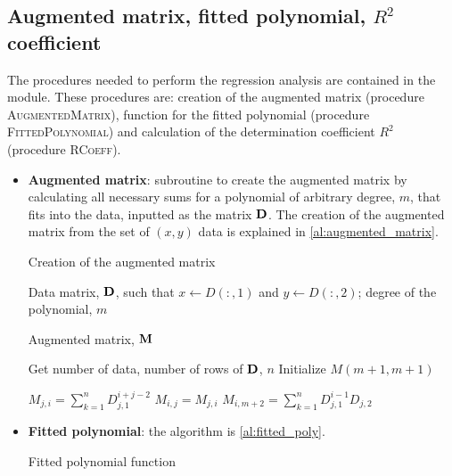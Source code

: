 \subsection{Augmented matrix, fitted polynomial, $R^2$ coefficient}
The procedures needed to perform the regression analysis are contained in the 
 module. These procedures are: creation
of the augmented matrix (procedure \textsc{AugmentedMatrix}), function for the 
fitted polynomial (procedure \textsc{FittedPolynomial}) and calculation of the
determination coefficient $R^2$ (procedure \textsc{RCoeff}).

\begin{itemize}
    \item \textbf{Augmented matrix}: subroutine to create the augmented matrix
        by calculating all necessary sums for a polynomial of arbitrary degree, $m$,
        that fits into the data, inputted as the matrix $\boldsymbol{\mathrm{D}}$. The creation of
        the augmented matrix from the set of $\left( x,y \right)$ data is explained in
        \cref{al:augmented_matrix}.
        \begin{algorithm}
            \caption{Creation of the augmented matrix}\label{al:augmented_matrix}
            \begin{algorithmic}[1]

                \Input Data matrix, $\boldsymbol{\mathrm{D}}$, such that $x \leftarrow D\left( :,1 \right)$ 
                and $y \leftarrow D\left( :,2 \right)$;
                degree of the polynomial, $m$ 

                \Output Augmented matrix, $\boldsymbol{\mathrm{M}}$

                \State Get number of data, number of rows of $\boldsymbol{\mathrm{D}}$, $n$
                \State Initialize $M\left( m+1, m+1 \right)$

                        \State $M_{j,i} = \sum_{k = 1}^{n} D_{j,1}^{i + j - 2}$
                        \State $M_{i,j} = M_{j,i}$
                    \EndFor
                    \State $M_{i, m+2} = \sum_{k = 1}^{n} D_{j,1}^{i - 1} D_{j,2}$
                \EndFor

                \EndProcedure
            \end{algorithmic}
        \end{algorithm}

    \item \textbf{Fitted polynomial}: the algorithm is \cref{al:fitted_poly}.
        \begin{algorithm}
            \caption{Fitted polynomial function}\label{al:fitted_poly}
            \begin{algorithmic}[1]


\end{algorithmic}
\end{algorithm}
\end{itemize}

